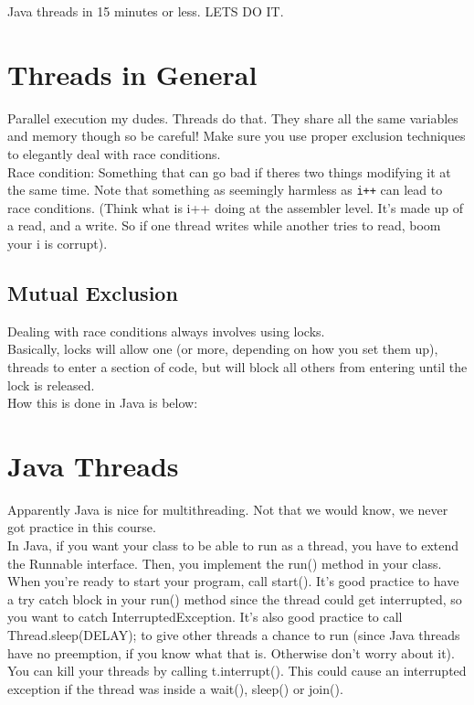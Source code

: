 \documentclass[12pt]{article}
\theoremstyle{definition}
\begin{document}
Java threads in 15 minutes or less. LETS DO IT.
\\ \linebreak
\section{Threads in General}
Parallel execution my dudes. Threads do that. They share all the same variables and memory though so be careful! Make sure you use proper exclusion techniques to elegantly deal with race conditions.
\\ \linebreak
Race condition: Something that can go bad if theres two things modifying it at the same time. Note that something as seemingly harmless as \texttt{i++} can lead to race conditions. (Think what is i++ doing at the assembler level. It's made up of a read, and a write. So if one thread writes while another tries to read, boom your i is corrupt). 
\subsection{Mutual Exclusion}
Dealing with race conditions always involves using locks.
\\ \linebreak
Basically, locks will allow one (or more, depending on how you set them up), threads to enter a section of code, but will block all others from entering until the lock is released. 
\\ \linebreak
How this is done in Java is below:

\section{Java Threads}
Apparently Java is nice for multithreading. Not that we would know, we never got practice in this course.
\\ \linebreak
In Java, if you want your class to be able to run as a thread, you have to extend the Runnable interface. Then, you implement the run() method in your class.
\\ \linebreak
When you're ready to start your program, call start(). It's good practice to have a try catch block in your run() method since the thread could get interrupted, so you want to catch InterruptedException. It's also good practice to call Thread.sleep(DELAY); to give other threads a chance to run (since Java threads have no preemption, if you know what that is. Otherwise don't worry about it). 
\\ \linebreak
You can kill your threads by calling t.interrupt(). This could cause an interrupted exception if the thread was inside a wait(), sleep() or join().
\end{document}

